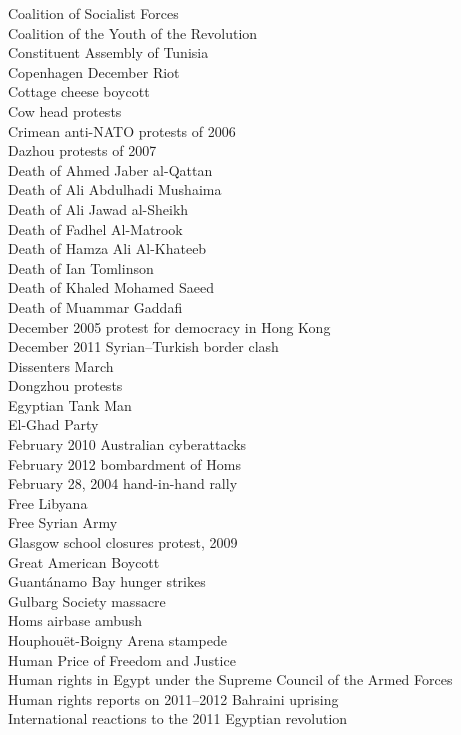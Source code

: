 Coalition of Socialist Forces\\
Coalition of the Youth of the Revolution\\
Constituent Assembly of Tunisia\\
Copenhagen December Riot\\
Cottage cheese boycott\\
Cow head protests\\
Crimean anti-NATO protests of 2006\\
Dazhou protests of 2007\\
Death of Ahmed Jaber al-Qattan\\
Death of Ali Abdulhadi Mushaima\\
Death of Ali Jawad al-Sheikh\\
Death of Fadhel Al-Matrook\\
Death of Hamza Ali Al-Khateeb\\
Death of Ian Tomlinson\\
Death of Khaled Mohamed Saeed\\
Death of Muammar Gaddafi\\
December 2005 protest for democracy in Hong Kong\\
December 2011 Syrian–Turkish border clash\\
Dissenters March\\
Dongzhou protests\\
Egyptian Tank Man\\
El-Ghad Party\\
February 2010 Australian cyberattacks\\
February 2012 bombardment of Homs\\
February 28, 2004 hand-in-hand rally\\
Free Libyana\\
Free Syrian Army\\
Glasgow school closures protest, 2009\\
Great American Boycott\\
Guantánamo Bay hunger strikes\\
Gulbarg Society massacre\\
Homs airbase ambush\\
Houphouët-Boigny Arena stampede\\
Human Price of Freedom and Justice\\
Human rights in Egypt under the Supreme Council of the Armed Forces\\
Human rights reports on 2011–2012 Bahraini uprising\\
International reactions to the 2011 Egyptian revolution\\
